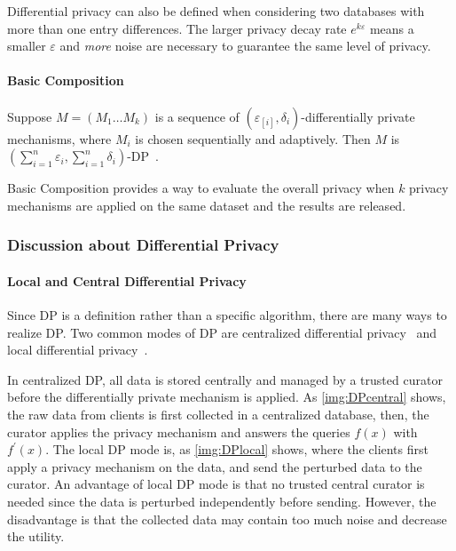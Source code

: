 Differential privacy can also be defined when considering two databases with more than one entry differences. The larger privacy decay rate $e^{k\varepsilon}$ means a smaller $\varepsilon$ and \textit{more} noise are necessary to guarantee the same level of privacy.

\paragraph{Basic Composition}
\begin{theorem}
    Suppose $M=\left( M_{1}\ldots M_{k}\right)$  is a sequence of $\left( \varepsilon_[i] ,\delta_{i} \right)$-differentially private mechanisms, where $M_{i}$ is chosen sequentially and adaptively. Then $M$ is $\left(\sum_{i=1}^n\varepsilon_{i} ,\sum_{i=1}^n\delta_{i} \right)$-DP~\cite{dwork2014algorithmic}.
\end{theorem}

Basic Composition provides a way to evaluate the overall privacy when $k$ privacy mechanisms are applied on the same dataset and the results are released.



\subsubsection{Discussion about Differential Privacy}

\paragraph{Local and Central Differential Privacy}
Since DP is a definition rather than a specific algorithm, there are many ways to realize DP. Two common modes of DP are centralized differential privacy~\cite{dwork2014algorithmic} and local differential privacy~\cite{dinur2003revealing}.

In centralized DP, all data is stored centrally and managed by a trusted curator before the differentially private mechanism is applied. As \autoref{img:DPcentral} shows, the raw data from clients is first collected in a centralized database, then, the curator applies the privacy mechanism and answers the queries $f\left(x\right)$ with $f^{\prime}\left(x\right)$.
The local DP mode is, as \autoref{img:DPlocal} shows, where the clients first apply a privacy mechanism on the data, and send the perturbed data to the curator.
An advantage of local DP mode is that no trusted central curator is needed since the data is perturbed independently before sending. However, the disadvantage is that the collected data may contain too much noise and decrease the utility.

